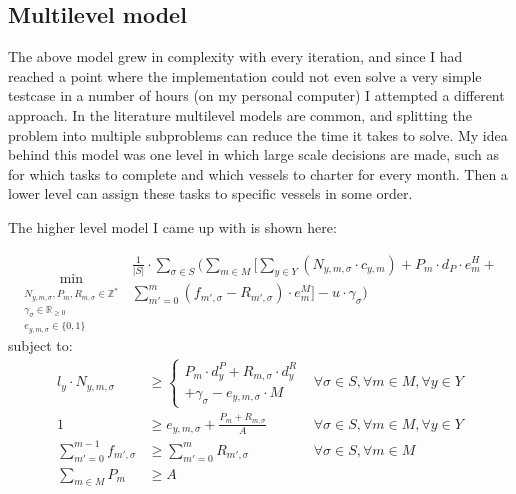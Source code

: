 \documentclass[a4paper,12pt]{article}
\begin{document}
\subsection{Multilevel model}
The above model grew in complexity with every iteration, and since I had reached a point where the implementation could not even solve a very simple testcase in a number of hours (on my personal computer) I attempted a different approach. In the literature multilevel models are common, and splitting the problem into multiple subproblems can reduce the time it takes to solve. My idea behind this model was one level in which large scale decisions are made, such as for which tasks to complete and which vessels to charter for every month. Then a lower level can assign these tasks to specific vessels in some order. 

The higher level model I came up with is shown here:

\begin{equation}
	\min_{\substack{N_{y,m,\sigma}, P_m, R_{m,\sigma} \in \mathbb{Z}^* \\
	\gamma_\sigma \in \mathbb{R}_{\geq 0} \\
	e_{y,m,\sigma} \in \{0, 1\} }}
	\begin{aligned}
	\frac{1}{|S|} \cdot \sum_{\sigma \in S} ( \sum_{m \in M} [\sum_{y \in Y} 
	(N_{y,m,\sigma} \cdot c_{y,m}) +  
	P_m \cdot d_P \cdot e^H_m + \\
	\sum_{m' = 0}^{m} (f_{m',\sigma} - R_{m',\sigma}) \cdot e^M_m ]
	- u \cdot \gamma_\sigma)
	\end{aligned}	
\end{equation}
subject to:
\begin{align}
l_y \cdot N_{y,m,\sigma} 			&\geq 	\begin{cases} P_m \cdot d^P_y + R_{m,\sigma} \cdot d^R_y \\
								+ \gamma_\sigma - e_{y,m,\sigma} \cdot M \end{cases}
																				& \forall \sigma \in S, \forall m \in M, \forall y \in Y 	\\
1 						&\geq		e_{y,m,\sigma} + \frac{P_m + R_{m,\sigma}}{A}					& \forall \sigma \in S, \forall m \in M, \forall y \in Y 	\\
\sum_{m' = 0}^{m-1} f_{m',\sigma}	&\geq 	\sum_{m' = 0}^m R_{m',\sigma}								& \forall \sigma \in S, \forall m \in M			\\
\sum_{m\in M} P_m 			&\geq 	A 												&						
\end{align}
\end{document}
